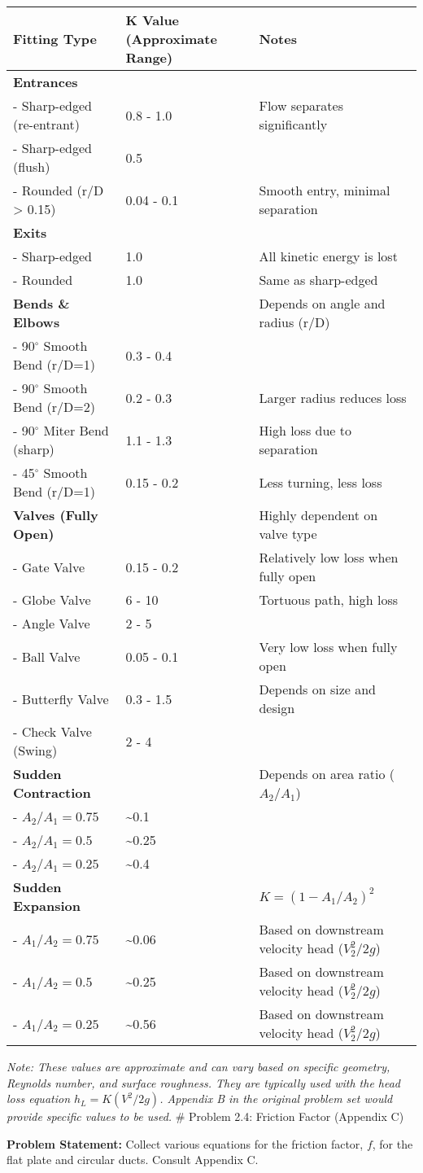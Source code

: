 \begin{longtable}[]{@{}lll@{}}
\toprule
Fitting Type & K Value (Approximate Range) & Notes\tabularnewline
\midrule
\endhead
\textbf{Entrances} & &\tabularnewline
- Sharp-edged (re-entrant) & 0.8 - 1.0 & Flow separates
significantly\tabularnewline
- Sharp-edged (flush) & 0.5 &\tabularnewline
- Rounded (r/D \textgreater{} 0.15) & 0.04 - 0.1 & Smooth entry, minimal
separation\tabularnewline
\textbf{Exits} & &\tabularnewline
- Sharp-edged & 1.0 & All kinetic energy is lost\tabularnewline
- Rounded & 1.0 & Same as sharp-edged\tabularnewline
\textbf{Bends \& Elbows} & & Depends on angle and radius
(r/D)\tabularnewline
- 90\(^\circ\) Smooth Bend (r/D=1) & 0.3 - 0.4 &\tabularnewline
- 90\(^\circ\) Smooth Bend (r/D=2) & 0.2 - 0.3 & Larger radius reduces
loss\tabularnewline
- 90\(^\circ\) Miter Bend (sharp) & 1.1 - 1.3 & High loss due to
separation\tabularnewline
- 45\(^\circ\) Smooth Bend (r/D=1) & 0.15 - 0.2 & Less turning, less
loss\tabularnewline
\textbf{Valves (Fully Open)} & & Highly dependent on valve
type\tabularnewline
- Gate Valve & 0.15 - 0.2 & Relatively low loss when fully
open\tabularnewline
- Globe Valve & 6 - 10 & Tortuous path, high loss\tabularnewline
- Angle Valve & 2 - 5 &\tabularnewline
- Ball Valve & 0.05 - 0.1 & Very low loss when fully open\tabularnewline
- Butterfly Valve & 0.3 - 1.5 & Depends on size and
design\tabularnewline
- Check Valve (Swing) & 2 - 4 &\tabularnewline
\textbf{Sudden Contraction} & & Depends on area ratio
(\(A_2/A_1\))\tabularnewline
- \(A_2/A_1 = 0.75\) & \textasciitilde0.1 &\tabularnewline
- \(A_2/A_1 = 0.5\) & \textasciitilde0.25 &\tabularnewline
- \(A_2/A_1 = 0.25\) & \textasciitilde0.4 &\tabularnewline
\textbf{Sudden Expansion} & & \(K = (1 - A_1/A_2)^2\)\tabularnewline
- \(A_1/A_2 = 0.75\) & \textasciitilde0.06 & Based on downstream
velocity head (\(V_2^2/2g\))\tabularnewline
- \(A_1/A_2 = 0.5\) & \textasciitilde0.25 & Based on downstream velocity
head (\(V_2^2/2g\))\tabularnewline
- \(A_1/A_2 = 0.25\) & \textasciitilde0.56 & Based on downstream
velocity head (\(V_2^2/2g\))\tabularnewline
\bottomrule
\end{longtable}

\emph{Note: These values are approximate and can vary based on specific
geometry, Reynolds number, and surface roughness. They are typically
used with the head loss equation \(h_L = K (V^2 / 2g)\). Appendix B in
the original problem set would provide specific values to be used.} \#
Problem 2.4: Friction Factor (Appendix C)

\textbf{Problem Statement:} Collect various equations for the friction
factor, \(f\), for the flat plate and circular ducts. Consult Appendix
C.

